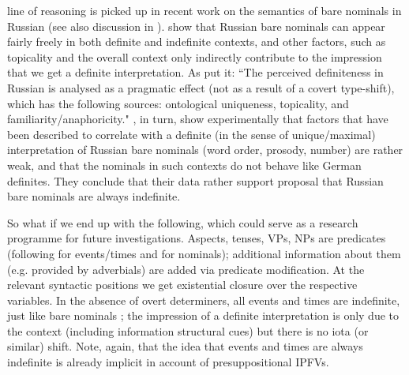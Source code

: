 \documentclass[output=paper,colorlinks,citecolor=brown]{langscibook}
\begin{document}
 line of reasoning is picked up in recent work on the semantics of bare nominals in Russian \citep{simikdemian20, %
seresborik21} (see also discussion in ). \citeauthor{seresborik21} show that Russian bare nominals can appear fairly freely in both definite and indefinite contexts, and other factors, such as topicality and the overall context only indirectly contribute to the impression that we get a definite interpretation. As \citet[][340]{seresborik21} put it: ``The perceived definiteness in Russian is analysed as a pragmatic effect (not as a result of a covert type-shift), which has the following sources: ontological uniqueness, topicality, and familiarity/anaphoricity." \citeauthor{simikdemian20}, in turn, show experimentally that factors that have been described to correlate with a definite (in the sense of unique/maximal) interpretation of Russian bare nominals (word order, prosody, number) are rather weak, and that the nominals in such contexts do not behave like German definites. They conclude that their data rather support  proposal that Russian bare nominals are always indefinite.  

So what if we end up with the following, which could serve as a research programme for future investigations. Aspects, tenses, VPs, NPs are predicates (following \citealt{gronnstechow16} for events/times and \citealt{coppockbeaver15} for nominals); additional information about them (e.g. provided by adverbials) are added via predicate modification. At the relevant syntactic positions we get existential closure over the respective variables. In the absence of overt determiners, all events and times are indefinite, just like bare nominals \citep[following][]{heim11,simikdemian20,seresborik21}; the impression of a definite interpretation is only due to the context (including information structural cues) but there is no iota (or similar) shift. Note, again, that the idea that events and times are always indefinite is already implicit in  account of presuppositional IPFVs. 
\end{document}
